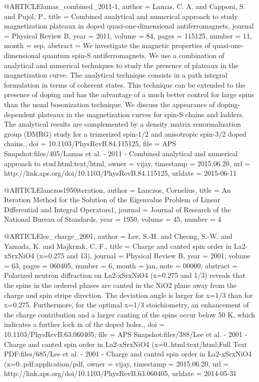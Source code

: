 @ARTICLE{lamas_combined_2011-1,
  author = {Lamas, C. A. and Capponi, S. and Pujol, P.},
  title = {Combined analytical and numerical approach to study magnetization
	plateaux in doped quasi-one-dimensional antiferromagnets},
  journal = {Physical Review B},
  year = {2011},
  volume = {84},
  pages = {115125},
  number = {11},
  month = sep,
  abstract = {We investigate the magnetic properties of quasi-one-dimensional quantum
	spin-S antiferromagnets. We use a combination of analytical and numerical
	techniques to study the presence of plateaux in the magnetization
	curve. The analytical technique consists in a path integral formulation
	in terms of coherent states. This technique can be extended to the
	presence of doping and has the advantage of a much better control
	for large spins than the usual bosonization technique. We discuss
	the appearance of doping-dependent plateaux in the magnetization
	curves for spin-S chains and ladders. The analytical results are
	complemented by a density matrix renormalization group (DMRG) study
	for a trimerized spin-1/2 and anisotropic spin-3/2 doped chains.},
  doi = {10.1103/PhysRevB.84.115125},
  file = {APS Snapshot:files/405/Lamas et al. - 2011 - Combined analytical and numerical approach to stud.html:text/html},
  owner = {vijay},
  timestamp = {2015.06.20},
  url = {http://link.aps.org/doi/10.1103/PhysRevB.84.115125},
  urldate = {2015-06-11}
}

@ARTICLE{lanczos1950iteration,
  author = {Lanczos, Cornelius},
  title = {An Iteration Method for the Solution of the Eigenvalue Problem of
	Linear Differential and Integral Operators1},
  journal = {Journal of Research of the National Bureau of Standards},
  year = {1950},
  volume = {45},
  number = {4}
}

@ARTICLE{lee_charge_2001,
  author = {Lee, S.-H. and Cheong, S.-W. and Yamada, K. and Majkrzak, C. F.},
  title = {Charge and canted spin order in {La}2-{xSrxNiO}4 (x=0.275 and 13)},
  journal = {Physical Review B},
  year = {2001},
  volume = {63},
  pages = {060405},
  number = {6},
  month = jan,
  note = {00000},
  abstract = {Polarized neutron diffraction on La2-xSrxNiO4 (x=0.275 and 1/3) reveals
	that the spins in the ordered phases are canted in the NiO2 plane
	away from the charge and spin stripe direction. The deviation angle
	is larger for x=1/3 than for x=0.275. Furthermore, for the optimal
	x=1/3 stoichiometry, an enhancement of the charge contribution and
	a larger canting of the spins occur below 50 K, which indicates a
	further lock in of the doped holes.},
  doi = {10.1103/PhysRevB.63.060405},
  file = {APS Snapshot:files/388/Lee et al. - 2001 - Charge and canted spin order in La2-xSrxNiO4 (x=0..html:text/html;Full Text PDF:files/685/Lee et al. - 2001 - Charge and canted spin order in La2-xSrxNiO4 (x=0..pdf:application/pdf},
  owner = {vijay},
  timestamp = {2015.06.20},
  url = {http://link.aps.org/doi/10.1103/PhysRevB.63.060405},
  urldate = {2014-05-31}
}

